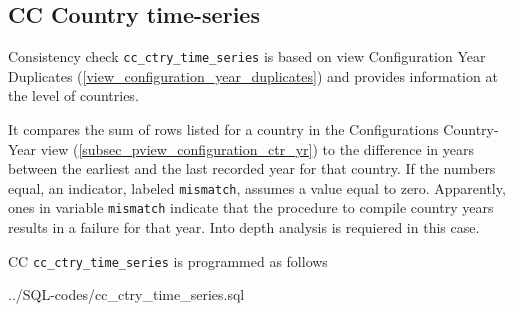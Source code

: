 \subsection{CC Country time-series}\label{subsec_cc_ctry_time_series}
Consistency check \texttt{\footnotesize cc\_ctry\_time\_series} is based on view Configuration Year Duplicates (\ref{view_configuration_year_duplicates}) and provides information at the level of countries. 

It compares the sum of rows listed for a country in the Configurations Country-Year view    (\ref{subsec_pview_configuration_ctr_yr}) 
to the difference in years between the earliest and the last recorded year for that country. If the numbers equal, an indicator, labeled \texttt{\footnotesize mismatch}, assumes a value equal to zero.
Apparently, ones in variable \texttt{\footnotesize mismatch} indicate that the procedure to compile country years results in a failure for that year. Into depth analysis is requiered in this case.

CC \texttt{\footnotesize cc\_ctry\_time\_series} is programmed as follows

%
{../SQL-codes/cc_ctry_time_series.sql}

